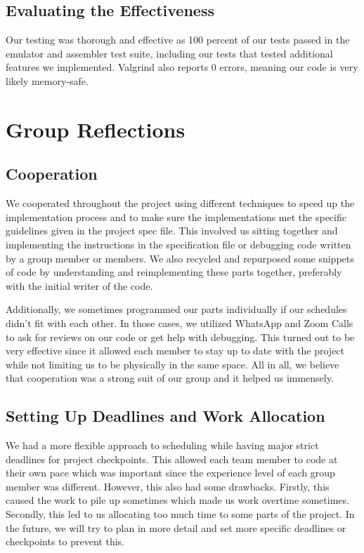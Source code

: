 \documentclass[11pt]{article}
\begin{document}
\subsection{Evaluating the Effectiveness}
Our testing was thorough and effective as 100 percent of our tests passed in the emulator and assembler test suite, including our tests that tested additional features we implemented. Valgrind also reports 0 errors, meaning our code is very likely memory-safe.


\section{Group Reflections}
\subsection{Cooperation}

We cooperated throughout the project using different techniques to speed up the implementation process and to make sure the implementations met the specific guidelines given in the project spec file. This involved us sitting together and implementing the instructions in the specification file or debugging code written by a group member or members. We also recycled and repurposed some snippets of code by understanding and reimplementing these parts together, preferably with the initial writer of the code.

Additionally, we sometimes programmed our parts individually if our schedules didn’t fit with each other. In those cases, we utilized WhatsApp and Zoom Calls to ask for reviews on our code or get help with debugging. This turned out to be very effective since it allowed each member to stay up to date with the project while not limiting us to be physically in the same space. All in all, we believe that cooperation was a strong suit of our group and it helped us immensely. 


\subsection{Setting Up Deadlines and Work Allocation}

We had a more flexible approach to scheduling while having major strict deadlines for project checkpoints. This allowed each team member to code at their own pace which was important since the experience level of each group member was different. However, this also had some drawbacks. Firstly, this caused the work to pile up sometimes which made us work overtime sometimes. Secondly, this led to us allocating too much time to some parts of the project. In the future, we will try to plan in more detail and set more specific deadlines or checkpoints to prevent this. 
\end{document}

